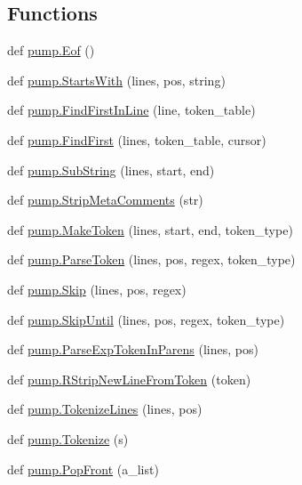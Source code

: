 \subsection*{Functions}
\begin{DoxyCompactItemize}
\item 
def \mbox{\hyperlink{namespacepump_a38844b22bd5a51c098b07c2c36c5c5b3}{pump.\+Eof}} ()
\item 
def \mbox{\hyperlink{namespacepump_a9353db466a97e632058887a77c3b26aa}{pump.\+Starts\+With}} (lines, pos, string)
\item 
def \mbox{\hyperlink{namespacepump_af9f92ec64fe45399c7e051115a107ee7}{pump.\+Find\+First\+In\+Line}} (line, token\+\_\+table)
\item 
def \mbox{\hyperlink{namespacepump_a08f2d05c192d11a134c008287bafef07}{pump.\+Find\+First}} (lines, token\+\_\+table, cursor)
\item 
def \mbox{\hyperlink{namespacepump_a859edb180cfc24c24fabcfb4f2bedf9e}{pump.\+Sub\+String}} (lines, start, end)
\item 
def \mbox{\hyperlink{namespacepump_a8c50cb40d65f26771c6f51eb265bb569}{pump.\+Strip\+Meta\+Comments}} (str)
\item 
def \mbox{\hyperlink{namespacepump_af96d60dc97b160f3a18e63857aabeef7}{pump.\+Make\+Token}} (lines, start, end, token\+\_\+type)
\item 
def \mbox{\hyperlink{namespacepump_a23761d99dd43d642e94d845218573035}{pump.\+Parse\+Token}} (lines, pos, regex, token\+\_\+type)
\item 
def \mbox{\hyperlink{namespacepump_a869bd8932d9ee97f3a0e789abd05d590}{pump.\+Skip}} (lines, pos, regex)
\item 
def \mbox{\hyperlink{namespacepump_a8935d04d89047866b07c59845e2d7d29}{pump.\+Skip\+Until}} (lines, pos, regex, token\+\_\+type)
\item 
def \mbox{\hyperlink{namespacepump_ae094486db14ecec9347129c5f230042d}{pump.\+Parse\+Exp\+Token\+In\+Parens}} (lines, pos)
\item 
def \mbox{\hyperlink{namespacepump_ae07150d94399cbe1661abe5929f921e0}{pump.\+R\+Strip\+New\+Line\+From\+Token}} (token)
\item 
def \mbox{\hyperlink{namespacepump_aa383d59e8e2a9507a576fd4c6b68b6b7}{pump.\+Tokenize\+Lines}} (lines, pos)
\item 
def \mbox{\hyperlink{namespacepump_aa42c23b1c914c0f86a94f2fa32999905}{pump.\+Tokenize}} (s)
\item 
def \mbox{\hyperlink{namespacepump_a8e2ff118da88397e88ccf68ebcd2df79}{pump.\+Pop\+Front}} (a\+\_\+list)

\end{DoxyCompactItemize}
